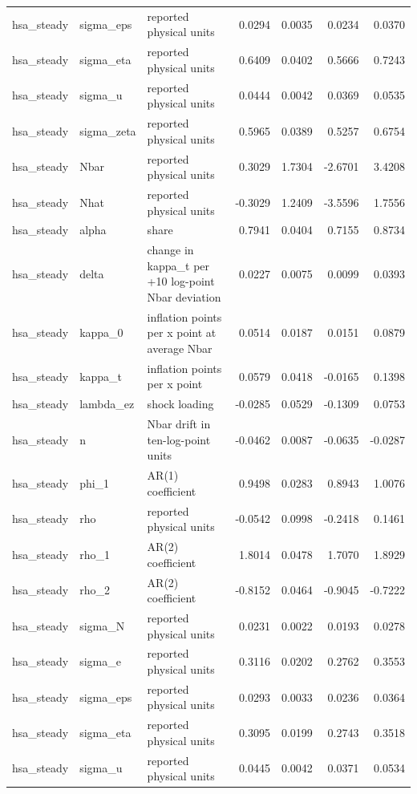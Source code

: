 \begin{tabular}{lllrrrr}
hsa\_steady & sigma\_eps & reported physical units & 0.0294 & 0.0035 & 0.0234 & 0.0370 \\
hsa\_steady & sigma\_eta & reported physical units & 0.6409 & 0.0402 & 0.5666 & 0.7243 \\
hsa\_steady & sigma\_u & reported physical units & 0.0444 & 0.0042 & 0.0369 & 0.0535 \\
hsa\_steady & sigma\_zeta & reported physical units & 0.5965 & 0.0389 & 0.5257 & 0.6754 \\
hsa\_steady & Nbar & reported physical units & 0.3029 & 1.7304 & -2.6701 & 3.4208 \\
hsa\_steady & Nhat & reported physical units & -0.3029 & 1.2409 & -3.5596 & 1.7556 \\
hsa\_steady & alpha & share & 0.7941 & 0.0404 & 0.7155 & 0.8734 \\
hsa\_steady & delta & change in kappa\_t per +10 log-point Nbar deviation & 0.0227 & 0.0075 & 0.0099 & 0.0393 \\
hsa\_steady & kappa\_0 & inflation points per x point at average Nbar & 0.0514 & 0.0187 & 0.0151 & 0.0879 \\
hsa\_steady & kappa\_t & inflation points per x point & 0.0579 & 0.0418 & -0.0165 & 0.1398 \\
hsa\_steady & lambda\_ez & shock loading & -0.0285 & 0.0529 & -0.1309 & 0.0753 \\
hsa\_steady & n & Nbar drift in ten-log-point units & -0.0462 & 0.0087 & -0.0635 & -0.0287 \\
hsa\_steady & phi\_1 & AR(1) coefficient & 0.9498 & 0.0283 & 0.8943 & 1.0076 \\
hsa\_steady & rho & reported physical units & -0.0542 & 0.0998 & -0.2418 & 0.1461 \\
hsa\_steady & rho\_1 & AR(2) coefficient & 1.8014 & 0.0478 & 1.7070 & 1.8929 \\
hsa\_steady & rho\_2 & AR(2) coefficient & -0.8152 & 0.0464 & -0.9045 & -0.7222 \\
hsa\_steady & sigma\_N & reported physical units & 0.0231 & 0.0022 & 0.0193 & 0.0278 \\
hsa\_steady & sigma\_e & reported physical units & 0.3116 & 0.0202 & 0.2762 & 0.3553 \\
hsa\_steady & sigma\_eps & reported physical units & 0.0293 & 0.0033 & 0.0236 & 0.0364 \\
hsa\_steady & sigma\_eta & reported physical units & 0.3095 & 0.0199 & 0.2743 & 0.3518 \\
hsa\_steady & sigma\_u & reported physical units & 0.0445 & 0.0042 & 0.0371 & 0.0534 \\

\end{tabular}
